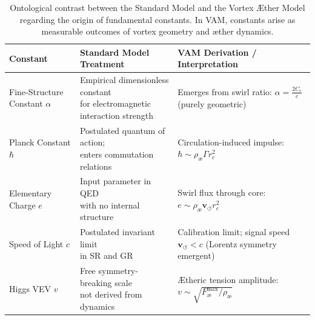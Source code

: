 \begin{table}[H]
    \centering
    \footnotesize
    \renewcommand{\arraystretch}{1.3}
    \begin{tabular}{|l|l|l|}
        \hline
        \textbf{Constant} & \textbf{Standard Model Treatment} & \textbf{VAM Derivation / Interpretation} \\
        \hline

        \makecell[l]{Fine-Structure \\ Constant $\alpha$} &
        \makecell[l]{Empirical dimensionless constant \\ for electromagnetic interaction strength} &
        \makecell[l]{Emerges from swirl ratio: \\ $\alpha = \frac{2 C_e}{c}$ \\ (purely geometric)} \\
        \hline

        \makecell[l]{Planck Constant \\ $\hbar$} &
        \makecell[l]{Postulated quantum of action; \\ enters commutation relations} &
        \makecell[l]{Circulation-induced impulse: \\ $\hbar \sim \rho_\text{\ae} \Gamma r_c^2$} \\
        \hline

        \makecell[l]{Elementary \\ Charge $e$} &
        \makecell[l]{Input parameter in QED \\ with no internal structure} &
        \makecell[l]{Swirl flux through core: \\ $e \sim \rho_\text{\ae} \mathbf{v}_{\scriptscriptstyle\boldsymbol{\circlearrowleft}} r_c^2$} \\
        \hline

        \makecell[l]{Speed of \\ Light $c$} &
        \makecell[l]{Postulated invariant limit \\ in SR and GR} &
        \makecell[l]{Calibration limit; \\ signal speed $\mathbf{v}_{\scriptscriptstyle\boldsymbol{\circlearrowleft}} < c$ \\ (Lorentz symmetry emergent)} \\
        \hline

        \makecell[l]{Higgs VEV \\ $v$} &
        \makecell[l]{Free symmetry-breaking scale \\ not derived from dynamics} &
        \makecell[l]{Ætheric tension amplitude: \\ $v \sim \sqrt{F^{\text{max}}_{\text{\ae}} / \rho_\text{\ae}}$} \\
        \hline

    \end{tabular}
    \caption{Ontological contrast between the Standard Model and the Vortex Æther Model regarding the origin of fundamental constants. In VAM, constants arise as measurable outcomes of vortex geometry and æther dynamics.}
    \label{tab:SM_vs_VAM_constants}
\end{table}

